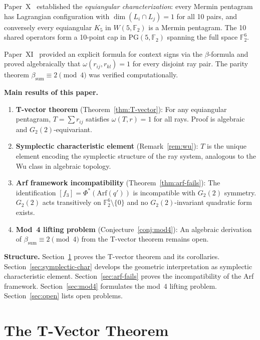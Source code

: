 \documentclass[11pt,a4paper]{article}
\theoremstyle{remark}
\newcommand{\F}{\mathbb{F}}
\begin{document}
Paper~X~\cite{PaperX} established the \emph{equiangular
characterization}: every Mermin pentagram has Lagrangian configuration
with $\dim(L_i \cap L_j) = 1$ for all 10 pairs, and conversely every
equiangular $K_5$ in $W(5, \F_2)$ is a Mermin pentagram. The 10 shared
operators form a 10-point cap in $\text{PG}(5, \F_2)$ spanning the full
space $\F_2^6$.

Paper~XI~\cite{PaperXI} provided an explicit formula for context signs
via the $\beta$-formula and proved algebraically that $\omega(r_{ij},
r_{kl}) = 1$ for every disjoint ray pair. The parity theorem
$\beta_{\text{sum}} \equiv 2 \pmod{4}$ was verified computationally.

\medskip

\textbf{Main results of this paper.}
\begin{enumerate}
  \item \textbf{T-vector theorem} (Theorem~\ref{thm:T-vector}):
    For any equiangular pentagram, $T = \sum r_{ij}$ satisfies
    $\omega(T, r) = 1$ for all rays. Proof is algebraic and
    $G_2(2)$-equivariant.
  \item \textbf{Symplectic characteristic element}
    (Remark~\ref{rem:wu}): $T$ is the unique element encoding the
    symplectic structure of the ray system, analogous to the Wu class
    in algebraic topology.
  \item \textbf{Arf framework incompatibility}
    (Theorem~\ref{thm:arf-fails}): The identification $[f_3] =
    \Phi^*(\text{Arf}(q'))$ is incompatible with $G_2(2)$ symmetry.
    $G_2(2)$ acts transitively on $\F_2^6 \setminus \{0\}$ and no
    $G_2(2)$-invariant quadratic form exists.
  \item \textbf{Mod~4 lifting problem}
    (Conjecture~\ref{conj:mod4}): An algebraic derivation of
    $\beta_{\text{sum}} \equiv 2 \pmod{4}$ from the T-vector theorem
    remains open.
\end{enumerate}

\medskip

\textbf{Structure.}
Section~\ref{sec:T-vector} proves the T-vector theorem and its
corollaries. Section~\ref{sec:symplectic-char} develops the geometric
interpretation as symplectic characteristic element.
Section~\ref{sec:arf-fails} proves the incompatibility of the Arf
framework. Section~\ref{sec:mod4} formulates the mod~4 lifting problem.
Section~\ref{sec:open} lists open problems.

\section{The T-Vector Theorem}
\label{sec:T-vector}
\end{document}
